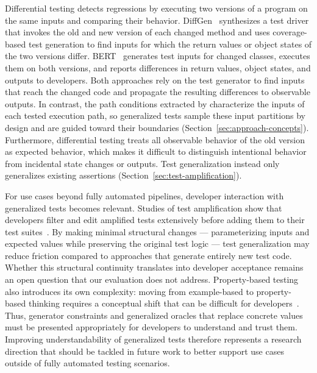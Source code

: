 Differential testing detects regressions by executing two versions of a program
on the same inputs and comparing their behavior.
DiffGen~\cite{taneja_2008_diffgen} synthesizes a test driver
that invokes the old and new version of each changed method
and uses coverage-based test generation to find inputs
for which the return values or object states of the two versions differ.
BERT~\cite{orso_2008_bert,jin_2010_behavioral} generates test inputs for changed classes,
executes them on both versions,
and reports differences in return values, object states, and outputs to developers.
Both approaches rely on the test generator to find inputs that reach the changed code
and propagate the resulting differences to observable outputs.
In contrast, the path conditions extracted by \ToolTeralizer{}
characterize the inputs of each tested execution path,
so generalized tests sample these input partitions by design
and are guided toward their boundaries (Section~\ref{sec:approach-concepts}).
Furthermore, differential testing treats all observable behavior
of the old version as expected behavior,
which makes it difficult to distinguish intentional behavior
from incidental state changes or outputs.
Test generalization instead only generalizes existing assertions
(Section~\ref{sec:test-amplification}).

For use cases beyond fully automated pipelines,
developer interaction with generalized tests becomes relevant.
Studies of test amplification show that developers filter and edit amplified tests extensively
before adding them to their test suites~\cite{wessel_2024_shaken,brandt_2022_developer}.
By making minimal structural changes
--- parameterizing inputs and expected values
while preserving the original test logic ---
test generalization may reduce friction
compared to approaches that generate entirely new test code.
Whether this structural continuity translates into developer acceptance
remains an open question that our evaluation does not address.
Property-based testing also introduces its own complexity:
moving from example-based to property-based thinking
requires a conceptual shift that can be difficult for developers~\cite{goldstein_2024_pbt_practice,hughes_2016_experiences}.
Thus, generator constraints and generalized oracles that replace concrete values
must be presented appropriately for developers to understand and trust them.
Improving understandability of generalized tests therefore represents a research direction
that should be tackled in future work to better support use cases
outside of fully automated testing scenarios.

